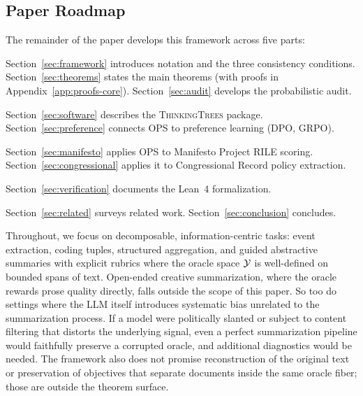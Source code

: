 \subsection{Paper Roadmap}

The remainder of the paper develops this framework across five parts:

\begin{description}[nosep]
    \item[Part I: Core Framework] Section~\ref{sec:framework} introduces notation and the three consistency conditions. Section~\ref{sec:theorems} states the main theorems (with proofs in Appendix~\ref{app:proofs-core}). Section~\ref{sec:audit} develops the probabilistic audit.

    \item[Part II: Software] Section~\ref{sec:software} describes the \textsc{ThinkingTrees} package. Section~\ref{sec:preference} connects OPS to preference learning (DPO, GRPO).

    \item[Part III: Applications] Section~\ref{sec:manifesto} applies OPS to Manifesto Project RILE scoring. Section~\ref{sec:congressional} applies it to Congressional Record policy extraction.

    \item[Part IV: Verification] Section~\ref{sec:verification} documents the Lean~4 formalization.

    \item[Part V: Discussion] Section~\ref{sec:related} surveys related work. Section~\ref{sec:conclusion} concludes.
\end{description}

Throughout, we focus on decomposable, information-centric tasks: event extraction, coding tuples, structured aggregation, and guided abstractive summaries with explicit rubrics where the oracle space $\mathcal{Y}$ is well-defined on bounded spans of text. Open-ended creative summarization, where the oracle rewards prose quality directly, falls outside the scope of this paper. So too do settings where the LLM itself introduces systematic bias unrelated to the summarization process. If a model were politically slanted or subject to content filtering that distorts the underlying signal, even a perfect summarization pipeline would faithfully preserve a corrupted oracle, and additional diagnostics would be needed. The framework also does not promise reconstruction of the original text or preservation of objectives that separate documents inside the same oracle fiber; those are outside the theorem surface.
